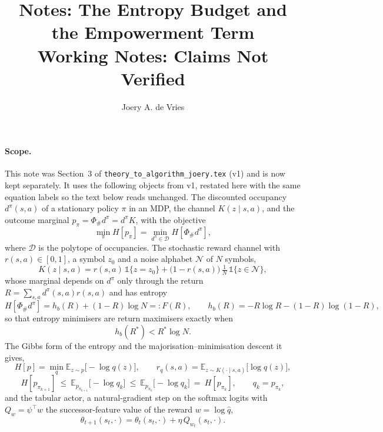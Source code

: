 \documentclass[11pt]{article}
\title{Notes: The Entropy Budget and the Empowerment Term\\
\Large \textbf{Working Notes: Claims Not Verified}}
\author{Joery A. de Vries}
\theoremstyle{remark}
\newcommand{\Dcal}{\mathcal D}
\newcommand{\Ncal}{\mathcal N}
\newcommand{\E}{\mathbb E}
\newcommand{\1}{\mathds{1}}
\newcommand{\occ}{d^{\pi}}
\newcommand{\push}{\Phi_{\#}}
\newcommand{\pz}{p_{\pi}}
\newcommand{\Hf}[1]{H\!\left[#1\right]}
\begin{document}
\maketitle

\paragraph{Scope.}
This note was Section~3 of \texttt{theory\_to\_algorithm\_joery.tex} (v1) and is now kept separately.
It uses the following objects from v1, restated here with the same equation labels so the text below reads unchanged.
The discounted occupancy $\occ(s,a)$ of a stationary policy $\pi$ in an MDP, the channel $K(z\mid s,a)$, and the outcome marginal $\pz=\push\occ=\occ K$, with the objective
\begin{equation}
  \min_{\pi}\Hf{\pz}=\min_{\occ\in\Dcal}\Hf{\push\occ},
  \label{eq:obj}
\end{equation}
where $\Dcal$ is the polytope of occupancies.
The stochastic reward channel with $r(s,a)\in[0,1]$, a symbol $z_0$ and a noise alphabet $\Ncal$ of $N$ symbols,
\begin{equation}
  K(z\mid s,a)=r(s,a)\,\1\{z=z_0\}+\big(1-r(s,a)\big)\,\tfrac{1}{N}\,\1\{z\in\Ncal\},
  \label{eq:stoch-channel}
\end{equation}
whose marginal depends on $\occ$ only through the return $R=\sum_{s,a}\occ(s,a)r(s,a)$ and has entropy
\begin{equation}
  \Hf{\push\occ}=h_b(R)+(1-R)\log N=:F(R),
  \qquad h_b(R)=-R\log R-(1-R)\log(1-R),
  \label{eq:stoch-channel-entropy}
\end{equation}
so that entropy minimisers are return maximisers exactly when
\begin{equation}
  h_b(R^\ast)<R^\ast\log N .
  \label{eq:stoch-channel-condition}
\end{equation}
The Gibbs form of the entropy and the majorisation--minimisation descent it gives,
\begin{equation}
  \Hf{p}=\min_q\E_{z\sim p}\big[-\log q(z)\big],
  \qquad
  r_q(s,a)=\E_{z\sim K(\cdot\mid s,a)}\big[\log q(z)\big],
  \label{eq:gibbs}
\end{equation}
\begin{equation}
  \Hf{p_{\pi_{k+1}}}\ \le\ \E_{p_{\pi_{k+1}}}\big[-\log q_k\big]\ \le\ \E_{p_{\pi_k}}\big[-\log q_k\big]\ =\ \Hf{p_{\pi_k}},
  \qquad q_k=p_{\pi_k},
  \label{eq:mm-descent}
\end{equation}
and the tabular actor, a natural-gradient step on the softmax logits with $Q_{w}=\psi^\top w$ the successor-feature value of the reward $w=\log\hat q$,
\begin{equation}
  \theta_{t+1}(s_t,\cdot)=\theta_t(s_t,\cdot)+\eta\,Q_{w_t}(s_t,\cdot).
  \label{eq:tab-pi}
\end{equation}
\end{document}

